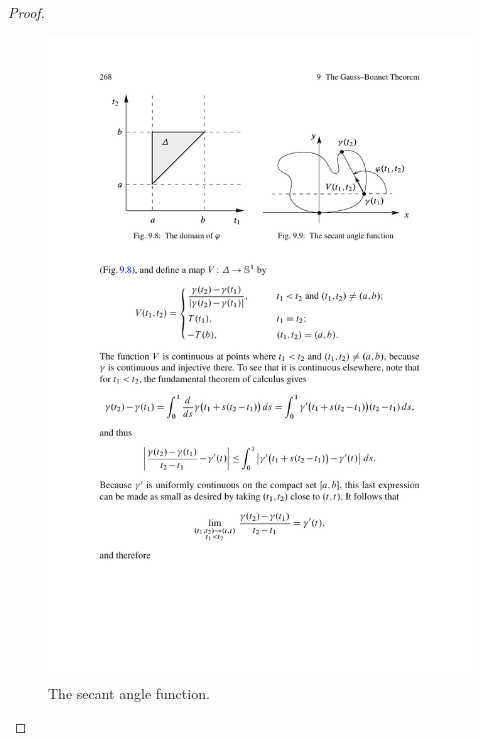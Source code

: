 \begin{proof}
\begin{figure}[htbp]
\hspace{20pt}
\begin{minipage}[b]{200pt}
\centering
\includegraphics{pictures/secant-angle-function}
\caption{The secant angle function.}
\end{minipage}
\end{figure}


\end{proof}
